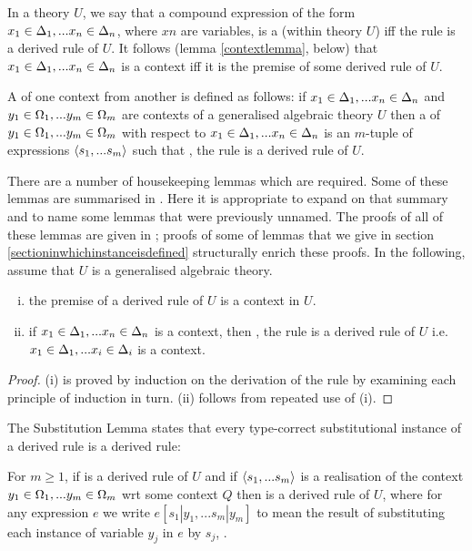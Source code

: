 In a theory $U$, we say that a compound expression of the form $x_1 \in \Delta_1,... x_{n} \in \Delta_{n}$, where $xn$ are variables, is a  (within theory $U$)  iff
the rule  is a derived rule of $U$. It follows (lemma \ref{contextlemma}, below)  that  $x_1 \in \Delta_1,... x_{n} \in \Delta_{n}$ is a context iff
it is the premise of some derived rule of $U$.

A  of one context from another is defined as follows: if $x_1 \in \Delta_1,... x_{n} \in \Delta_{n}$ and $y_1 \in \Omega_1,... y_{m} \in \Omega_{m}$ are contexts of a generalised algebraic theory $U$  then a  of  $y_1 \in \Omega_1,... y_{m} \in \Omega_{m}$ with respect to $x_1 \in \Delta_1,... x_{n} \in \Delta_{n}$ is an $m$-tuple of expressions $\langle s_1,...s_m\rangle$
such that \foreachj, the rule  is a derived rule of $U$.

There are a number of housekeeping lemmas  which are required. Some of these lemmas are summarised in \cite{Cartmell86}. 
Here it is appropriate to expand on that summary and to name some lemmas that were previously unnamed. The proofs of all of these lemmas 
	are given in \cite{Cartmell78}; proofs of some of  lemmas that we give in section \ref{sectioninwhichinstanceisdefined} structurally enrich these proofs.
In the following, assume that $U$ is a generalised algebraic theory.


\begin{lemma}
\begin{enumerate}[(i)]
\item the premise of a derived rule of $U$ is a context in $U$.
\item if $x_1 \in \Delta_1,... x_{n} \in \Delta_{n}$ is a context, then \foreachi, the rule  is a derived rule of $U$ i.e.
$x_1 \in \Delta_1,... x_{i} \in \Delta_{i}$ is a context.
\end{enumerate}
\end{lemma}
\begin{proof}
(i) is proved by induction on the derivation of the rule by examining each principle of induction in turn. (ii) follows from repeated use of (i).
\end{proof}

The Substitution Lemma states that every type-correct substitutional instance of a derived rule is a derived rule:
\begin{lemma}
For $m \geq 1$, if  is a derived rule of $U$
and  if $\langle s_1,...s_{m}\rangle$ is a realisation of the context $y_1 \in \Omega_1,... y_{m} \in \Omega_{m}$ wrt some context $Q$ 
then  is a derived rule of $U$, where
for any expression $e$ we write
$e[s_1|y_1,...s_m|y_m]$ to mean
the result of substituting each instance of variable $y_j$ in $e$ by $s_j$, \foreachj.
\end{lemma}

